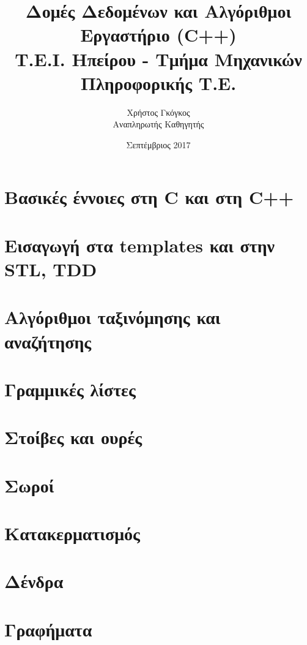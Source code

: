 \documentclass[11pt,a4paper]{book}
\title{Δομές Δεδομένων και Αλγόριθμοι \\ Εργαστήριο (C++)\\ Τ.Ε.Ι. Ηπείρου - Τμήμα Μηχανικών Πληροφορικής Τ.Ε.}
\author{Χρήστος Γκόγκος  \\ Αναπληρωτής Καθηγητής }
\date{Σεπτέμβριος 2017}
\begin{document}
\frontmatter
\maketitle
\tableofcontents
\mainmatter

\chapter{Βασικές έννοιες στη C και στη C++}


\chapter{Εισαγωγή στα templates και στην STL, TDD}


\chapter{Αλγόριθμοι ταξινόμησης και αναζήτησης}

\chapter{Γραμμικές λίστες}

\chapter{Στοίβες και ουρές}

\chapter{Σωροί}

\chapter{Κατακερματισμός}

\chapter{Δένδρα}

\chapter{Γραφήματα}

\begin{versionhistory}
\end{versionhistory}
\end{document}
